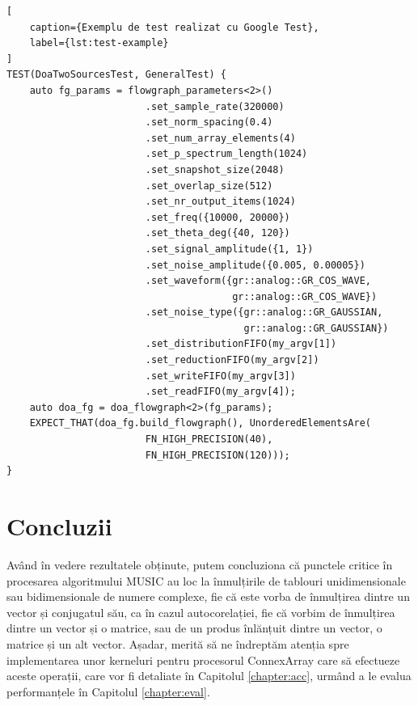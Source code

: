 \begin{lstlisting}[
    caption={Exemplu de test realizat cu Google Test},
    label={lst:test-example}
]
TEST(DoaTwoSourcesTest, GeneralTest) {
    auto fg_params = flowgraph_parameters<2>()
                        .set_sample_rate(320000)
                        .set_norm_spacing(0.4)
                        .set_num_array_elements(4)
                        .set_p_spectrum_length(1024)
                        .set_snapshot_size(2048)
                        .set_overlap_size(512)
                        .set_nr_output_items(1024)
                        .set_freq({10000, 20000})
                        .set_theta_deg({40, 120})
                        .set_signal_amplitude({1, 1})
                        .set_noise_amplitude({0.005, 0.00005})
                        .set_waveform({gr::analog::GR_COS_WAVE,
                                       gr::analog::GR_COS_WAVE})
                        .set_noise_type({gr::analog::GR_GAUSSIAN,
                                         gr::analog::GR_GAUSSIAN})
                        .set_distributionFIFO(my_argv[1])
                        .set_reductionFIFO(my_argv[2])
                        .set_writeFIFO(my_argv[3])
                        .set_readFIFO(my_argv[4]);
    auto doa_fg = doa_flowgraph<2>(fg_params);
    EXPECT_THAT(doa_fg.build_flowgraph(), UnorderedElementsAre(
                        FN_HIGH_PRECISION(40),
                        FN_HIGH_PRECISION(120)));
}
\end{lstlisting}



\section{Concluzii}
\label{sec:impl-concl}

Având în vedere rezultatele obținute, putem concluziona că punctele critice în
procesarea algoritmului MUSIC au loc la înmulțirile de tablouri unidimensionale
sau bidimensionale de numere complexe, fie că este vorba de înmulțirea dintre un
vector și conjugatul său, ca în cazul autocorelației, fie că vorbim de
înmulțirea dintre un vector și o matrice, sau de un produs înlănțuit dintre un
vector, o matrice și un alt vector. Așadar, merită să ne îndreptăm atenția
spre implementarea unor kerneluri pentru procesorul ConnexArray care să
efectueze aceste operații, care vor fi detaliate în Capitolul
\ref{chapter:acc}, urmând a le evalua performanțele în Capitolul
\ref{chapter:eval}. \\

